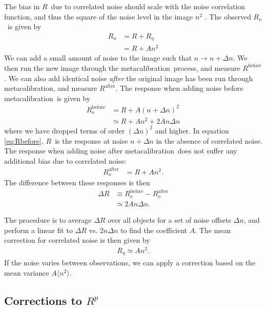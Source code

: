 \documentclass[usegraphicx,usenatbib]{mn2e}
\newcommand{\mcal}{metacalibration}
\newcommand{\mcalR}{$R$}
\newcommand{\mcalRpsf}{$R^{p}$}
\newcommand{\mcalRo}{$R_o$}
\newcommand{\mcalRnoise}{$R_\eta$}
\begin{document}
The bias in \mcalR\ due to correlated noise should scale with the 
noise correlation function, and thus the square of the noise level
in the image $n^2$ \citep{HirataCorrNoise}.  The observed \mcalRo\
is given by
\begin{align} \label{eq:scaling}
    \mbox{\mcalRo} &= R + \mbox{\mcalRnoise}  \nonumber \\
                   &= R + A n^2
\end{align}
We can add a small amount of noise to the image
such that $n \rightarrow n + \Delta n$. We then run the new image
through the \mcal\ process, and measure $R^{\mathrm{before}}$.  We can also
add identical noise {\em after} the original image  has been run through \mcal, and
measure $R^{\mathrm{after}}$.  The response when adding noise before
\mcal\ is given by
\begin{align}\label{eq:Rbefore}
    R_o^{\mathrm{before}} &= R + A (n + \Delta n)^2 \nonumber \\
       &\simeq R + A n^2 + 2 A n \Delta n
\end{align}
where we have dropped terms of order $(\Delta n)^2$ and higher.  In equation
\ref{eq:Rbefore}, \mcalR\ is the response at noise $n+\Delta n$ in the absence
of correlated noise.  The response when adding noise after \mcal\ does
not suffer any additional bias due to correlated noise:
\begin{align}
    R_o^{\mathrm{after}} &= R + A n^2.
\end{align}
The difference between these responses is then 
\begin{align}
    \Delta R &\equiv R_o^{\mathrm{before}} - R_o^{\mathrm{after}}  \nonumber \\
             &\simeq 2 A n \Delta n.
\end{align}

The procedure is to average $\Delta R$ over all objects for a set of noise offsets $\Delta
n$, and perform a linear fit to $\Delta R$ vs. $2 n \Delta n$ to find the
coefficient $A$.  The mean correction for correlated noise is then given by
\begin{align}
    \mbox{\mcalRnoise} \simeq A n^2.
\end{align}
If the noise varies between observations, we can apply a 
correction based on the mean variance $A
\langle n^2 \rangle$.


\subsection{Corrections to \mcalRpsf}
\end{document}
